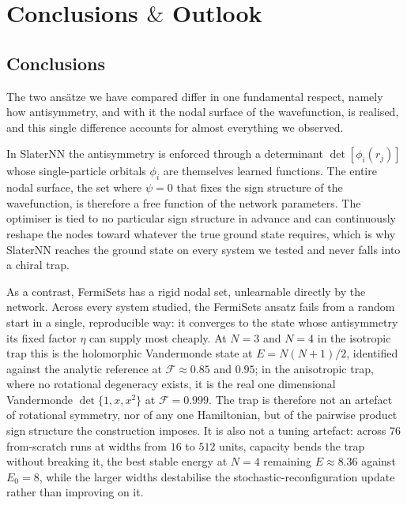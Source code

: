 \documentclass[a4paper,11pt,twoside]{article}
\begin{document}
\newpage

\section{Conclusions $\&$ Outlook}
\label{sec:conclusions_outlook}
\subsection*{Conclusions}

The two ansätze we have compared differ in one fundamental respect, namely how antisymmetry, and with it the nodal surface of the wavefunction, is realised, and this single difference accounts for almost everything we observed.

In SlaterNN the antisymmetry is enforced through a determinant $\det[\phi_i(r_j)]$ whose single-particle orbitals $\phi_i$ are themselves learned functions. The entire nodal surface, the set where $\psi = 0$ that fixes the sign structure of the wavefunction, is therefore a free function of the network parameters. The optimiser is tied to no particular sign structure in advance and can continuously reshape the nodes toward whatever the true ground state requires, which is why SlaterNN reaches the ground state on every system we tested and never falls into a chiral trap.

As a contrast, FermiSets has a rigid nodal set, unlearnable directly by the network. Across every system studied, the FermiSets ansatz fails from a random
start in a single, reproducible way: it converges to the state whose
antisymmetry its fixed factor $\eta$ can supply most cheaply. At $N=3$
and $N=4$ in the isotropic trap this is the holomorphic Vandermonde
state at $E = N(N+1)/2$, identified against the analytic reference at
$\mathcal{F} \approx 0.85$ and $0.95$; in the anisotropic trap, where
no rotational degeneracy exists, it is the real one dimensional
Vandermonde $\det\{1,x,x^2\}$ at $\mathcal{F} = 0.999$. The trap is
therefore not an artefact of rotational symmetry, nor of any one
Hamiltonian, but of the pairwise product sign structure the
construction imposes. It is also not a tuning artefact: across $76$
from-scratch runs at widths from $16$ to $512$ units, capacity bends
the trap without breaking it, the best stable energy at $N=4$
remaining $E \approx 8.36$ against $E_0 = 8$, while the larger widths
destabilise the stochastic-reconfiguration update rather than
improving on it.
\end{document}
